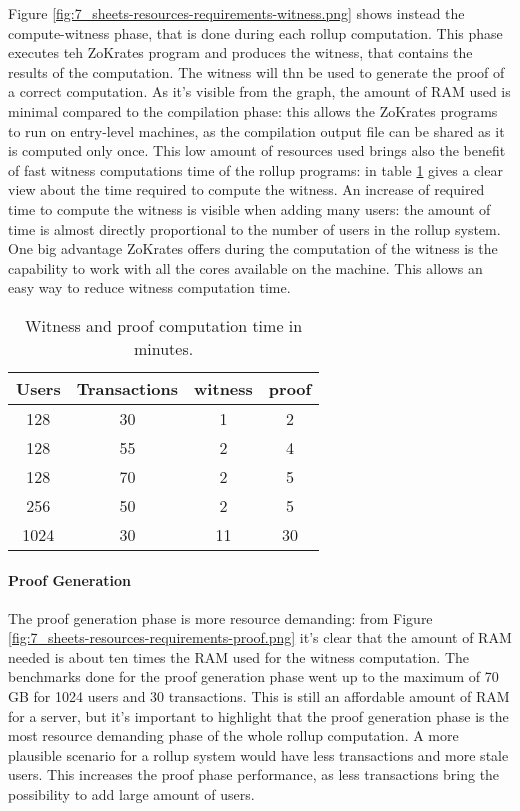 Figure \ref{fig:7_sheets-resources-requirements-witness.png} shows instead the compute-witness phase, that is done during each rollup computation. This phase executes teh ZoKrates program and produces the witness, that contains the results of the computation. The witness will thn be used to generate the proof of a correct computation. As it's visible from the graph, the amount of RAM used is minimal compared to the compilation phase: this allows the ZoKrates programs to run on entry-level machines, as the compilation output file can be shared as it is computed only once. This low amount of resources used brings also the benefit of fast witness computations time of the rollup programs: in table \ref{tab:6_witness-proof-time} gives a clear view about the time required to compute the witness. An increase of required time to compute the witness is visible when adding many users: the amount of time is almost directly proportional to the number of users in the rollup system. One big advantage ZoKrates offers during the computation of the witness is the capability to work with all the cores available on the machine. This allows an easy way to reduce witness computation time.

\begin{table}
	\centering
	\begin{tabular}{|c|c|c|c|}
		\hline
		Users & Transactions & witness & proof \\ \hline
		128   & 30           & 1       & 2     \\ \hline
		128   & 55           & 2       & 4     \\ \hline
		128   & 70           & 2       & 5     \\ \hline
		256   & 50           & 2       & 5     \\ \hline
		1024  & 30           & 11      & 30    \\ \hline
	\end{tabular}
	\caption[Witness Proof time]{Witness and proof computation time in minutes.}
	\label{tab:6_witness-proof-time}
\end{table}

\paragraph{Proof Generation}

The proof generation phase is more resource demanding: from Figure \ref{fig:7_sheets-resources-requirements-proof.png} it's clear that the amount of RAM needed is about ten times the RAM used for the witness computation. The benchmarks done for the proof generation phase went up to the maximum of 70 GB for 1024 users and 30 transactions. This is still an affordable amount of RAM for a server, but it's important to highlight that the proof generation phase is the most resource demanding phase of the whole rollup computation. A more plausible scenario for a rollup system would have less transactions and more stale users. This increases the proof phase performance, as less transactions bring the possibility to add large amount of users.

